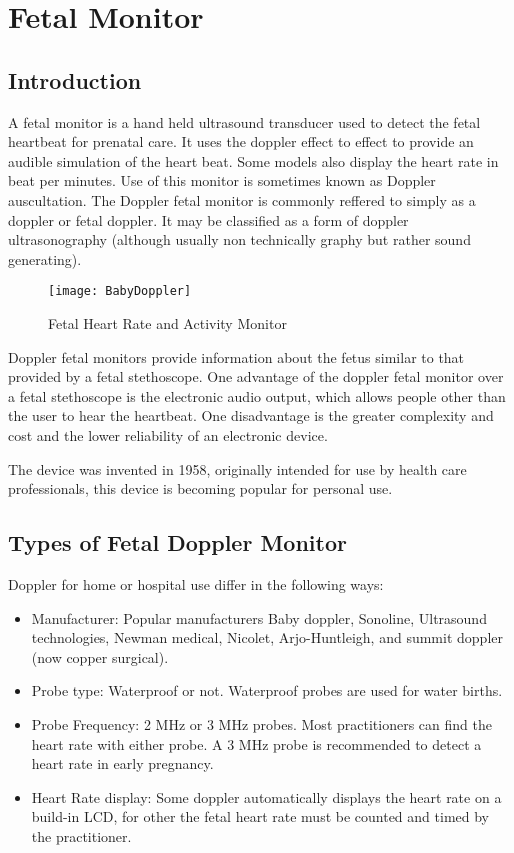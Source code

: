 \documentclass[12pt]{article}
\begin{document}
\section{Fetal Monitor}

\subsection{Introduction}
A fetal monitor is a hand held ultrasound transducer used to detect the fetal heartbeat for prenatal care. It uses the doppler effect to effect to provide an audible simulation of the heart beat. Some models also display the heart rate in beat per minutes. Use of this monitor is sometimes known as Doppler auscultation. The Doppler fetal monitor is commonly reffered to simply as a doppler or fetal doppler. It may be classified as a form of doppler ultrasonography (although usually non technically graphy but rather sound generating). 

\begin{figure}[ht]
\centering 
\texttt{[image: BabyDoppler]}
\caption{Fetal Heart Rate and Activity Monitor}
\end{figure}

Doppler fetal monitors provide information about the fetus similar to that provided by a fetal stethoscope. One advantage of the doppler fetal monitor over a fetal stethoscope is the electronic audio output, which allows people other than the user to hear the heartbeat. One disadvantage is the greater complexity and cost and the lower reliability of an electronic device.

The device was invented in 1958, originally intended for use by health care professionals, this device is becoming popular for personal use.

\subsection{Types of Fetal Doppler Monitor}

Doppler for home or hospital use differ in the following ways:
\begin{itemize}
\item Manufacturer: Popular manufacturers Baby doppler, Sonoline, Ultrasound technologies, Newman medical, Nicolet, Arjo-Huntleigh, and summit doppler (now copper surgical). 
\item Probe type: Waterproof or not. Waterproof probes are used for water births.
\item Probe Frequency: 2 MHz or 3 MHz probes. Most practitioners can find the heart rate with either probe. A 3 MHz probe is recommended to detect a heart rate in early pregnancy.
\item Heart Rate display: Some doppler automatically displays the heart rate on a build-in LCD, for other the fetal heart rate must be counted and timed by the practitioner.
\end{itemize}
\end{document}
